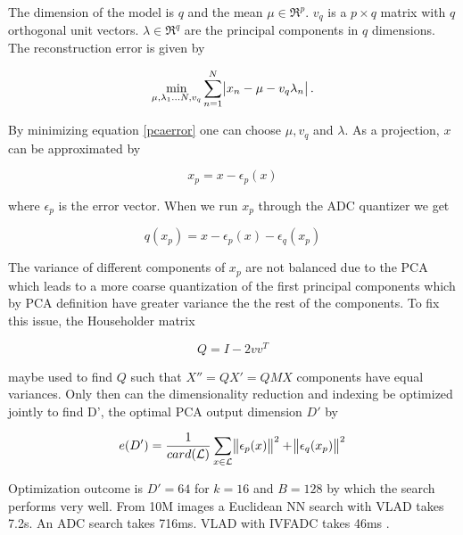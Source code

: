 \documentclass[english,12pt,a4paper,pdftex,elec,utf8, table]{aaltothesis}
\begin{document}
The dimension of the model is $q$ and the mean $\mu \in \Re^p$. $v_q$ is a $p \times q$ matrix with $q$ orthogonal unit vectors. $\lambda \in \Re^q$ are the principal components in $q$ dimensions. The reconstruction error is given by

\begin{equation}\label{pcaerror}
\min_{\mu,\lambda_1\ldots N, v_q}\sum_{n=1}^N \abs{x_n-\mu - v_q\lambda_n}.
\end{equation}

By minimizing equation \ref{pcaerror} one can choose $\mu, v_q$ and $\lambda$. \cite{Blei2008} As a projection, $x$ can be approximated by

\begin{equation}\label{vladpca}
x_p = x -\epsilon_p(x)
\end{equation}

where $\epsilon_p$ is the error vector. \cite{Jegou2014} When we run $x_p$ through the ADC quantizer we get

\begin{equation}\label{vladpcaquant}
  q(x_p) = x - \epsilon_p(x) - \epsilon_q(x_p)
\end{equation}

The variance of different components of $x_p$ are not balanced due to the PCA \cite{Jegou2014} which leads to a more coarse quantization of the first principal components which by PCA definition have greater variance the the rest of the components. To fix this issue, the Householder matrix

\begin{equation}\label{householder}
Q = I - 2vv^T
\end{equation}

maybe used to find $Q$ such that $X'' = QX' = QMX$ components have equal variances.\cite{Jegou2014} Only then can the dimensionality reduction and indexing be optimized jointly to find D', the optimal PCA output dimension $D'$ by

\begin{equation}\label{jointoptimization}
e(D') = \frac{1}{card(\mathcal{L})}\sum_{x\in \mathcal{L}}\norm{\epsilon_p(x)}^2 + \norm{\epsilon_q(x_p)}^2
\end{equation}

Optimization outcome is $D'=64$ for $k=16$ and $B=128$ by which the search performs very well. From 10M images a Euclidean NN search with VLAD takes 7.2s. An ADC search takes 716ms. VLAD with IVFADC takes 46ms \cite{Jegou2014}.
\end{document}
